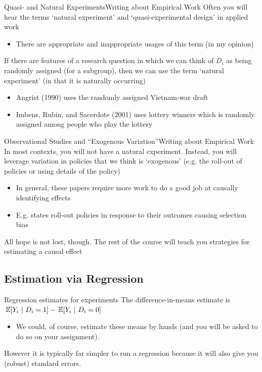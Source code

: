 \documentclass[aspectratio=169,t,11pt,table]{beamer}
\begin{document}
\begin{frame}{Quasi- and Natural Experiments}{Writing about Empirical Work}
  Often you will hear the terms `natural experiment' and `quasi-experimental design' in applied work
  \begin{itemize}
    \item There are appropriate and inappropriate usages of this term (in my opinion)
  \end{itemize}

  \bigskip
  If there are features of a research question in which we can think of $D_i$ as being randomly assigned (for a subgroup), then we can use the term `natural experiment' (in that it is naturally occurring)
  \begin{itemize}
    \item Angrist (1990) uses the randomly assigned Vietnam-war draft
    \item Imbens, Rubin, and Sacerdote (2001) uses lottery winners which is randomly assigned among people who play the lottery
  \end{itemize}
\end{frame}

\begin{frame}{Observational Studies and ``Exogenous Variation''}{Writing about Empirical Work}
  In most contexts, you will not have a natural experiment. Instead, you will leverage variation in policies that we think is `exogenous' (e.g. the roll-out of policies or using details of the policy)

  \begin{itemize}
    \item In general, these papers require more work to do a good job at causally identifying effects
    
    \item E.g. states roll-out policies in response to their outcomes causing selection bias
  \end{itemize}

  \pause
  \bigskip
  All hope is not lost, though. The rest of the course will teach you strategies for estimating a causal effect
\end{frame}

\subsection{Estimation via Regression}

\begin{frame}{Regression estimates for experiments}
  The difference-in-means estimate is $\expec{Y_i}{D_i = 1} - \expec{Y_i}{D_i = 0}$
  \begin{itemize}
    \item We could, of course, estimate these means by hands (and you will be asked to do so on your assignment). 
  \end{itemize}

  However it is typically far simpler to run a regression because it will also give you (robust) standard errors. 
\end{frame}
\end{document}
